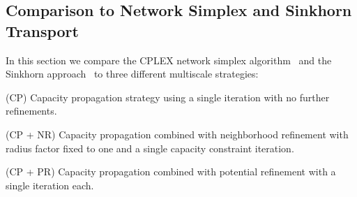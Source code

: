 \documentclass[twoside,11pt]{article}
\begin{document}
\subsection{Comparison to Network Simplex and Sinkhorn Transport}
In this section we compare the CPLEX network simplex algorithm~\citep{cplex}
and the Sinkhorn approach~\citep{cuturi:nips2013}  to three different
multiscale strategies: 
\begin{compactenum}
\item (CP)  Capacity propagation strategy using a single iteration with no
  further refinements.  
\item (CP + NR) Capacity propagation combined with neighborhood refinement
    with radius factor fixed to one and a single capacity constraint iteration.
\item (CP + PR) Capacity propagation combined with potential refinement with a
  single iteration each.
\end{compactenum}
\end{document}
